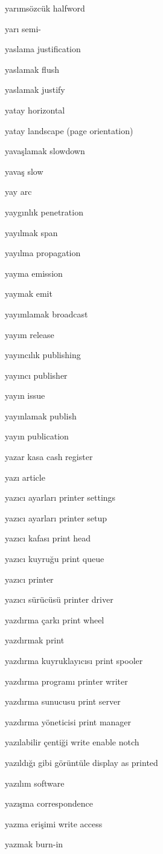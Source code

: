 \documentclass[12pt,fleqn]{article}\usepackage{../../common}
\begin{document}
yarımsözcük halfword

yarı semi-

yaslama justification

yaslamak flush

yaslamak justify

yatay horizontal

yatay landscape (page orientation)

yavaşlamak slowdown

yavaş slow

yay arc

yaygınlık penetration

yayılmak span

yayılma propagation

yayma emission

yaymak emit

yayımlamak broadcast

yayım release

yayıncılık publishing

yayıncı publisher

yayın issue

yayınlamak publish

yayın publication

yazar kasa cash register

yazı article

yazıcı ayarları printer settings

yazıcı ayarları printer setup

yazıcı kafası print head

yazıcı kuyruğu print queue

yazıcı printer

yazıcı sürücüsü printer driver

yazdırma çarkı print wheel

yazdırmak print

yazdırma kuyruklayıcısı print spooler

yazdırma programı printer writer

yazdırma sunucusu print server

yazdırma yöneticisi print manager

yazılabilir çentiği write enable notch

yazıldığı gibi görüntüle display as printed

yazılım software

yazışma correspondence

yazma erişimi write access

yazmak burn-in
\end{document}
